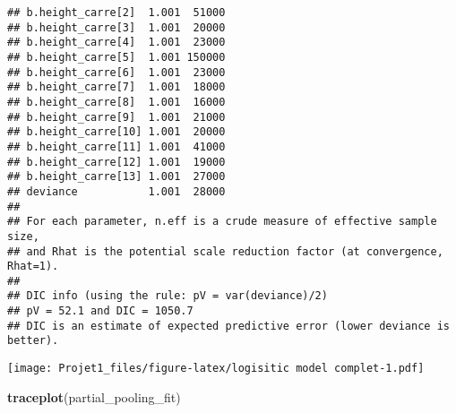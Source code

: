 \documentclass[
]{article}
\newenvironment{Shaded}{\begin{snugshade}}{\end{snugshade}}
\newcommand{\AttributeTok}[1]{\textcolor[rgb]{0.13,0.29,0.53}{#1}}
\newcommand{\DecValTok}[1]{\textcolor[rgb]{0.00,0.00,0.81}{#1}}
\newcommand{\FunctionTok}[1]{\textcolor[rgb]{0.13,0.29,0.53}{\textbf{#1}}}
\newcommand{\NormalTok}[1]{#1}
\newcommand{\SpecialCharTok}[1]{\textcolor[rgb]{0.81,0.36,0.00}{\textbf{#1}}}
\begin{document}
\begin{verbatim}
## b.height_carre[2]  1.001  51000
## b.height_carre[3]  1.001  20000
## b.height_carre[4]  1.001  23000
## b.height_carre[5]  1.001 150000
## b.height_carre[6]  1.001  23000
## b.height_carre[7]  1.001  18000
## b.height_carre[8]  1.001  16000
## b.height_carre[9]  1.001  21000
## b.height_carre[10] 1.001  20000
## b.height_carre[11] 1.001  41000
## b.height_carre[12] 1.001  19000
## b.height_carre[13] 1.001  27000
## deviance           1.001  28000
## 
## For each parameter, n.eff is a crude measure of effective sample size,
## and Rhat is the potential scale reduction factor (at convergence, Rhat=1).
## 
## DIC info (using the rule: pV = var(deviance)/2)
## pV = 52.1 and DIC = 1050.7
## DIC is an estimate of expected predictive error (lower deviance is better).
\end{verbatim}

\begin{Shaded}
\end{Shaded}

\texttt{[image: Projet1\_files/figure-latex/logisitic model complet-1.pdf]}

\begin{Shaded}
\begin{Highlighting}[]
\FunctionTok{traceplot}\NormalTok{(partial\_pooling\_fit)}
\end{Highlighting}
\end{Shaded}
\end{document}
